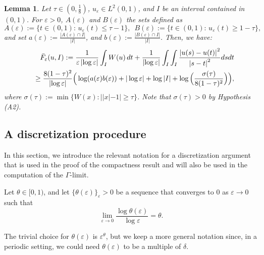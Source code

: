 \documentclass[12pt]{article}
\newtheorem{lemma}[definition]{Lemma}
\numberwithin{equation}{section}
\begin{document}
\begin{lemma}\label{lower bound lemma}
Let $\tau\in(0,\frac{1}{8})$, $u_\varepsilon \in L^2(0,1)$, and $I$ be an interval contained in $(0,1)$.  
For $\varepsilon>0$, $A(\varepsilon)$ and $B(\varepsilon)$ the sets defined as
\begin{equation*}
     A({\varepsilon}):=\big\{t\in (0,1):\,u_{\varepsilon}(t)\le\tau-1\big\},\,\,\, B({\varepsilon}):=\big\{t\in (0,1):\,u_{\varepsilon}(t)\ge1-\tau\big\},
 \end{equation*}
and set
$\displaystyle a(\varepsilon) := \frac{|A({\varepsilon}) \cap I|}{|I|}$,
and
$\displaystyle b(\varepsilon) := \frac{|B({\varepsilon}) \cap I|}{|I|}$.
Then, we have:
\begin{eqnarray}
\label{lover bound ineq}\nonumber
&&\hskip-1.6cm\bar{F}_{\varepsilon}(u,I):=
\frac{1}{\varepsilon\left|\log\varepsilon\right|}\int_{I} W(u)\,dt+\frac{1}{\left|\log\varepsilon\right|}
\int_{I}\int_{I}
\frac{\left|u(s)-u(t)\right|^2}{\left|s-t\right|^2}
dsdt\\
&&\ge
\frac{8(1-\tau)^2}{\left|\log\varepsilon\right|}
\Big(
\log(a(\varepsilon) b(\varepsilon))
+|\log\varepsilon|+\log{|I|}+\log\Big(\frac{\sigma(\tau)}{8(1-\tau)^2}\Big)
\Big),
\end{eqnarray}
where $\sigma(\tau):=\min\{W(x): ||x|-1|\ge\tau\}$. Note that
$\sigma(\tau)>0$ by Hypothesis {\rm (A2)}.
\end{lemma}





\subsection{A discretization procedure}\label{discr}
In this section, we introduce the relevant notation for a discretization argument that is used in the proof of the compactness result and will also be used in the computation of the $\Gamma$-limit.

Let $\theta\in[0,1)$, and let $\{\theta(\varepsilon)\}_{\varepsilon}>0$ be a sequence that converges to $0$ as $\varepsilon\to0$ such that 
\begin{equation}
\label{theta-eps}
\lim_{\varepsilon\to0}\frac{\log{\theta(\varepsilon)}}{\log{\varepsilon}}=\theta.
\end{equation}

The trivial choice for $\theta(\varepsilon)$ is $\varepsilon^\theta$, but we keep a more general notation since, in a periodic setting, we could need $\theta(\varepsilon)$ to be a multiple of $\delta$.
\end{document}
